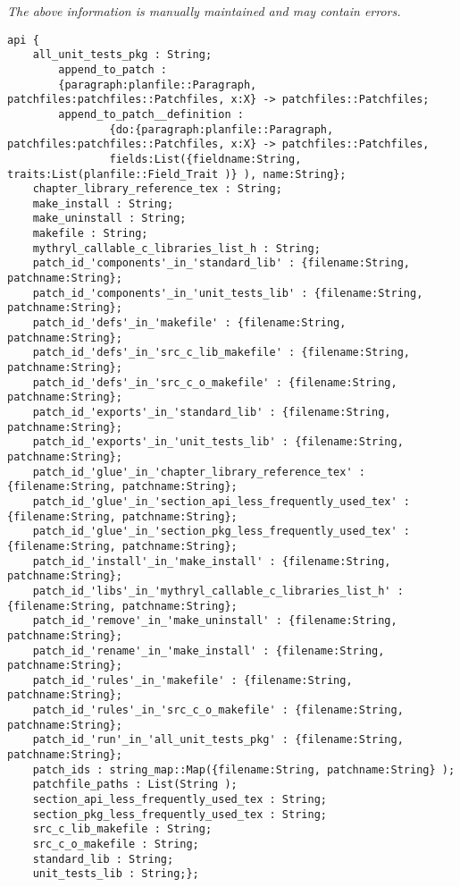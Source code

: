 \label{pkg:library\_patchpoints}

{\tiny \it The above information is manually maintained and may contain errors.}
\begin{verbatim}
api {
    all_unit_tests_pkg : String;
        append_to_patch :
        {paragraph:planfile::Paragraph, patchfiles:patchfiles::Patchfiles, x:X} -> patchfiles::Patchfiles;
        append_to_patch__definition :
                {do:{paragraph:planfile::Paragraph, patchfiles:patchfiles::Patchfiles, x:X} -> patchfiles::Patchfiles,
                fields:List({fieldname:String, traits:List(planfile::Field_Trait )} ), name:String};
    chapter_library_reference_tex : String;
    make_install : String;
    make_uninstall : String;
    makefile : String;
    mythryl_callable_c_libraries_list_h : String;
    patch_id_'components'_in_'standard_lib' : {filename:String, patchname:String};
    patch_id_'components'_in_'unit_tests_lib' : {filename:String, patchname:String};
    patch_id_'defs'_in_'makefile' : {filename:String, patchname:String};
    patch_id_'defs'_in_'src_c_lib_makefile' : {filename:String, patchname:String};
    patch_id_'defs'_in_'src_c_o_makefile' : {filename:String, patchname:String};
    patch_id_'exports'_in_'standard_lib' : {filename:String, patchname:String};
    patch_id_'exports'_in_'unit_tests_lib' : {filename:String, patchname:String};
    patch_id_'glue'_in_'chapter_library_reference_tex' : {filename:String, patchname:String};
    patch_id_'glue'_in_'section_api_less_frequently_used_tex' : {filename:String, patchname:String};
    patch_id_'glue'_in_'section_pkg_less_frequently_used_tex' : {filename:String, patchname:String};
    patch_id_'install'_in_'make_install' : {filename:String, patchname:String};
    patch_id_'libs'_in_'mythryl_callable_c_libraries_list_h' : {filename:String, patchname:String};
    patch_id_'remove'_in_'make_uninstall' : {filename:String, patchname:String};
    patch_id_'rename'_in_'make_install' : {filename:String, patchname:String};
    patch_id_'rules'_in_'makefile' : {filename:String, patchname:String};
    patch_id_'rules'_in_'src_c_o_makefile' : {filename:String, patchname:String};
    patch_id_'run'_in_'all_unit_tests_pkg' : {filename:String, patchname:String};
    patch_ids : string_map::Map({filename:String, patchname:String} );
    patchfile_paths : List(String );
    section_api_less_frequently_used_tex : String;
    section_pkg_less_frequently_used_tex : String;
    src_c_lib_makefile : String;
    src_c_o_makefile : String;
    standard_lib : String;
    unit_tests_lib : String;};
\end{verbatim}
